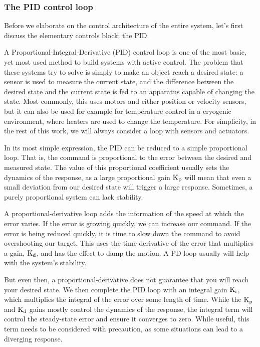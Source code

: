 \subsubsection{The PID control loop}

Before we elaborate on the control architecture of the entire system, let's first discuss the elementary controls block: the PID.

A Proportional-Integral-Derivative (PID) control loop is one of the most basic, yet most used method to build systems with active control. The problem that these systems try to solve is simply to make an object reach a desired state: a sensor is used to measure the current state, and the difference between the desired state and the current state is fed to an apparatus capable of changing the state. Most commonly, this uses motors and either position or velocity sensors, but it can also be used for example for temperature control in a cryogenic environment, where heaters are used to change the temperature. For simplicity, in the rest of this work, we will always consider a loop with sensors and actuators. 

In its most simple expression, the PID can be reduced to a simple proportional loop. That is, the command is proportional to the error between the desired and measured state. The value of this proportional coefficient usually sets the dynamics of the response, as a large proportional gain $\textrm{K}_\textrm{p}$ will mean that even a small deviation from our desired state will trigger a large response. Sometimes, a purely proportional system can lack stability.

A proportional-derivative loop adds the information of the speed at which the error varies. If the error is growing quickly, we can increase our command. If the error is being reduced quickly, it is time to slow down the command to avoid overshooting our target. This uses the time derivative of the error that multiplies a gain, $\textrm{K}_\textrm{d}$, and has the effect to damp the motion. A PD loop usually will help with the system's stability.

But even then, a proportional-derivative does not guarantee that you will reach your desired state. We then complete the PID loop with an integral gain $\textrm{K}_\textrm{i}$, which multiplies the integral of the error over some length of time. While the $\textrm{K}_\textrm{p}$ and $\textrm{K}_\textrm{d}$ gains mostly control the dynamics of the response, the integral term will control the steady-state error and ensure it converges to zero. While useful, this term needs to be considered with precaution, as some situations can lead to a diverging response.

